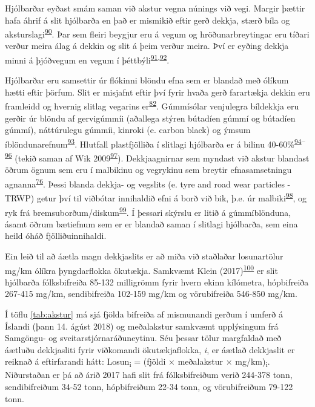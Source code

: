 \documentclass[icelandic,]{book}
\begin{document}
Hjólbarðar eyðast smám saman við akstur vegna núnings við vegi. Margir þættir hafa áhrif á slit hjólbarða en það er mismikið eftir gerð dekkja, stærð bíla og aksturslagi\textsuperscript{\protect\hyperlink{ref-panko2018review}{90}}. Þar sem fleiri beygjur eru á vegum og hröðunarbreytingar eru tíðari verður meira álag á dekkin og slit á þeim verður meira. Því er eyðing dekkja minni á þjóðvegum en vegum í þéttbýli\textsuperscript{\protect\hyperlink{ref-luhana2004measurement}{91},\protect\hyperlink{ref-Kwak2013}{92}}.

Hjólbarðar eru samsettir úr flókinni blöndu efna sem er blandað með ólíkum hætti eftir þörfum. Slit er misjafnt eftir því fyrir hvaða gerð farartækja dekkin eru framleidd og hvernig slitlag vegarins er\textsuperscript{\protect\hyperlink{ref-grigoratos2014non}{82}}. Gúmmísólar venjulegra bíldekkja eru gerðir úr blöndu af gervigúmmíi (aðallega stýren bútadíen gúmmí og bútadíen gúmmí), náttúrulegu gúmmíi, kinroki (e. carbon black) og ýmsum íblöndunarefnum\textsuperscript{\protect\hyperlink{ref-Evans2006}{93}}. Hlutfall plastfjölliða í slitlagi hjólbarða er á bilinu 40-60\%\textsuperscript{\protect\hyperlink{ref-Redondo-hasselerharm2018}{94}--\protect\hyperlink{ref-barbin1994science}{96}} (tekið saman af Wik 2009\textsuperscript{\protect\hyperlink{ref-Wik2009}{97}}). Dekkjaagnirnar sem myndast við akstur blandast öðrum ögnum sem eru í malbikinu og vegrykinu sem breytir efnasamsetningu agnanna\textsuperscript{\protect\hyperlink{ref-kreider2010physical}{76}}. Þessi blanda dekkja- og vegslits (e. tyre and road wear particles - TRWP) getur því til viðbótar innihaldið efni á borð við bik, þ.e. úr malbiki\textsuperscript{\protect\hyperlink{ref-fauser2002tire}{98}}, og ryk frá bremsuborðum/diskum\textsuperscript{\protect\hyperlink{ref-kwak2013characterization}{99}}. Í þessari skýrslu er litið á gúmmíblönduna, ásamt öðrum bætiefnum sem er er blandað saman í slitlagi hjólbarða, sem eina heild óháð fjölliðuinnihaldi.

Ein leið til að áætla magn dekkjaslits er að miða við staðlaðar losunartölur mg/km ólíkra þyngdarflokka ökutækja. Samkvæmt Klein (2017)\textsuperscript{\protect\hyperlink{ref-klein2017methods}{100}} er slit hjólbarða fólksbifreiða 85-132 milligrömm fyrir hvern ekinn kílómetra, hópbifreiða 267-415 mg/km, sendibifreiða 102-159 mg/km og vörubifreiða 546-850 mg/km.

Í töflu \ref{tab:akstur} má sjá fjölda bifreiða af mismunandi gerðum í umferð á Íslandi (þann 14. ágúst 2018) og meðalakstur samkvæmt upplýsingum frá Samgöngu- og sveitarstjórnaráðuneytinu. Séu þessar tölur margfaldað með áætluðu dekkjasliti fyrir viðkomandi ökutækjaflokka, \emph{i}, er áætlað dekkjaslit er reiknað á eftirfarandi hátt: Losun\textsubscript{i} = (fjöldi × meðalakstur × mg/km)\textsubscript{i}. Niðurstaðan er þá að árið 2017 hafi slit frá fólksbifreiðum verið 244-378 tonn, sendibifreiðum 34-52 tonn, hópbifreiðum 22-34 tonn, og vörubifreiðum 79-122 tonn.
\end{document}
